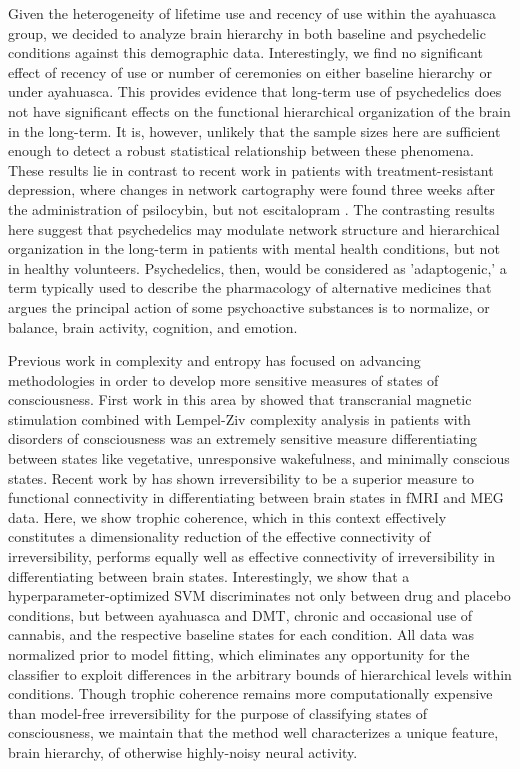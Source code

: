 Given the heterogeneity of lifetime use and recency of use within
the ayahuasca group, we decided to analyze brain hierarchy in both baseline
and psychedelic conditions against this demographic data. Interestingly,
we find no significant effect of recency of use or number of ceremonies
on either baseline hierarchy or under ayahuasca. This provides evidence
that long-term use of psychedelics does not have significant effects
on the functional hierarchical organization of the brain in the long-term. It is, however, unlikely that the sample sizes here are sufficient enough to detect a robust statistical relationship between these phenomena. These
results lie in contrast to recent work in patients with treatment-resistant depression, where changes in network cartography were found three weeks after
the administration of psilocybin, but not escitalopram \parencite{Daws2022}. The contrasting results here suggest that psychedelics may modulate network structure
and hierarchical organization in the long-term in patients with mental health conditions, but not in healthy volunteers. Psychedelics, then, would be considered as 'adaptogenic,' a term typically used to describe the pharmacology
of alternative medicines that argues the principal action of some psychoactive substances is to normalize, or balance, brain activity, cognition, and emotion.

Previous work in complexity and entropy has focused on advancing methodologies in order to develop more sensitive measures of
states of consciousness. First work in this area by \textcite{Casali2013} showed that transcranial magnetic stimulation
combined with Lempel-Ziv complexity analysis in patients with disorders of consciousness was an extremely sensitive measure differentiating
between states like vegetative, unresponsive wakefulness, and minimally conscious states. Recent work by \textcite{Tewarie2023, Kringelbach2023} has shown irreversibility to be a superior measure to functional connectivity
in differentiating between brain states in fMRI and MEG data. Here, we show trophic coherence, which in this context
effectively constitutes a dimensionality reduction of the effective connectivity of irreversibility, performs
equally well as effective connectivity of irreversibility in differentiating between brain states. Interestingly,
we show that a hyperparameter-optimized SVM discriminates not only between drug and placebo conditions, but between ayahuasca and DMT, chronic and occasional use of cannabis, and the respective baseline states for each condition. All data was
normalized prior to model fitting, which eliminates any opportunity for the classifier to exploit differences in the
arbitrary bounds of hierarchical levels within conditions. Though trophic coherence remains more computationally
expensive than model-free irreversibility for the purpose of classifying states of consciousness, we maintain
that the method well characterizes a unique feature, brain hierarchy, of otherwise highly-noisy neural activity.



